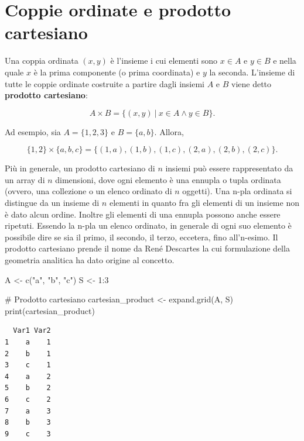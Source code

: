\documentclass[
  italian,
  letterpaper,
  a4paper,
  11pt,
  open=any]{scrbook}
\newenvironment{Shaded}{\begin{snugshade}}{\end{snugshade}}
\newcommand{\CommentTok}[1]{\textcolor[rgb]{0.37,0.37,0.37}{#1}}
\newcommand{\DecValTok}[1]{\textcolor[rgb]{0.68,0.00,0.00}{#1}}
\newcommand{\FunctionTok}[1]{\textcolor[rgb]{0.28,0.35,0.67}{#1}}
\newcommand{\NormalTok}[1]{\textcolor[rgb]{0.00,0.23,0.31}{#1}}
\newcommand{\OtherTok}[1]{\textcolor[rgb]{0.00,0.23,0.31}{#1}}
\newcommand{\SpecialCharTok}[1]{\textcolor[rgb]{0.37,0.37,0.37}{#1}}
\newcommand{\StringTok}[1]{\textcolor[rgb]{0.13,0.47,0.30}{#1}}
\theoremstyle{plain}
\theoremstyle{definition}
\theoremstyle{definition}
\theoremstyle{remark}
\begin{document}
\section{Coppie ordinate e prodotto
cartesiano}\label{coppie-ordinate-e-prodotto-cartesiano}

Una coppia ordinata \((x,y)\) è l'insieme i cui elementi sono
\(x \in A\) e \(y \in B\) e nella quale \(x\) è la prima componente (o
prima coordinata) e \(y\) la seconda. L'insieme di tutte le coppie
ordinate costruite a partire dagli insiemi \(A\) e \(B\) viene detto
\textbf{prodotto cartesiano}:

\[
A \times B = \{(x, y) ~\vert~ x \in A \land y \in B\}.
\]

Ad esempio, sia \(A = \{1, 2, 3\}\) e \(B = \{a, b\}\). Allora,

\[
\{1, 2\} \times \{a, b, c\} = \{(1, a), (1, b), (1, c), (2, a), (2, b), (2, c)\}.
\]

Più in generale, un prodotto cartesiano di \(n\) insiemi può essere
rappresentato da un array di \(n\) dimensioni, dove ogni elemento è una
ennupla o tupla ordinata (ovvero, una collezione o un elenco ordinato di
\(n\) oggetti). Una n-pla ordinata si distingue da un insieme di \(n\)
elementi in quanto fra gli elementi di un insieme non è dato alcun
ordine. Inoltre gli elementi di una ennupla possono anche essere
ripetuti. Essendo la n-pla un elenco ordinato, in generale di ogni suo
elemento è possibile dire se sia il primo, il secondo, il terzo,
eccetera, fino all'n-esimo. Il prodotto cartesiano prende il nome da
René Descartes la cui formulazione della geometria analitica ha dato
origine al concetto.

\begin{Shaded}
\begin{Highlighting}[]
\NormalTok{A }\OtherTok{\textless{}{-}} \FunctionTok{c}\NormalTok{(}\StringTok{"a"}\NormalTok{, }\StringTok{"b"}\NormalTok{, }\StringTok{"c"}\NormalTok{)}
\NormalTok{S }\OtherTok{\textless{}{-}} \DecValTok{1}\SpecialCharTok{:}\DecValTok{3}

\CommentTok{\# Prodotto cartesiano}
\NormalTok{cartesian\_product }\OtherTok{\textless{}{-}} \FunctionTok{expand.grid}\NormalTok{(A, S)}
\FunctionTok{print}\NormalTok{(cartesian\_product)}
\end{Highlighting}
\end{Shaded}

\begin{verbatim}
  Var1 Var2
1    a    1
2    b    1
3    c    1
4    a    2
5    b    2
6    c    2
7    a    3
8    b    3
9    c    3
\end{verbatim}
\end{document}
